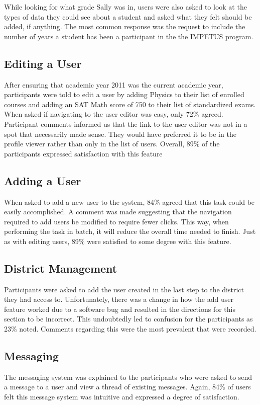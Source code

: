 While looking for what grade Sally was in, users were also asked to look at the types of data they could see about a student and asked what they felt should be added, if anything. The most common response was the request to include the number of years a student has been a participant in the the IMPETUS program.

\subsection*{Editing a User}
After ensuring that academic year 2011 was the current academic year, participants were told to edit a user by adding Physics to their list of enrolled courses and adding an SAT Math score of 750 to their list of standardized exams. When asked if navigating to the user editor was easy, only 72\% agreed. Participant comments informed us that the link to the user editor was not in a spot that necessarily made sense. They would have preferred it to be in the profile viewer rather than only in the list of users. Overall, 89\% of the participants expressed satisfaction with this feature

\subsection*{Adding a User}
When asked to add a new user to the system, 84\% agreed that this task could be easily accomplished. A comment was made suggesting that the navigation required to add users be modified to require fewer clicks. This way, when performing the task in batch, it will reduce the overall time needed to finish. Just as with editing users, 89\% were satisfied to some degree with this feature.

\subsection*{District Management}
Participants were asked to add the user created in the last step to the district they had access to. Unfortunately, there was a change in how the add user feature worked due to a software bug and resulted in the directions for this section to be incorrect. This undoubtedly led to confusion for the participants as 23\% noted. Comments regarding this were the most prevalent that were recorded.

\subsection*{Messaging}
The messaging system was explained to the participants who were asked to send a message to a user and view a thread of existing messages. Again, 84\% of users felt this message system was intuitive and expressed a degree of satisfaction.

